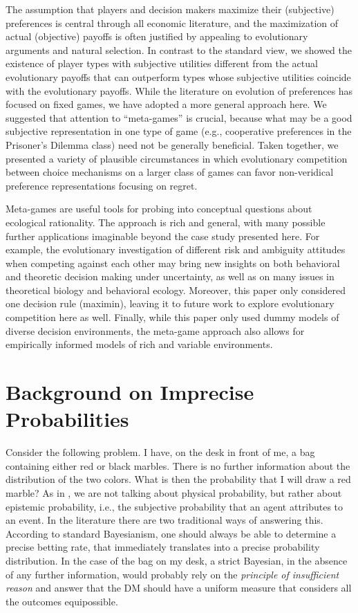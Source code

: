 \documentclass[fleqn,reqno,12pt]{article}
\theoremstyle{Satz}
\theoremstyle{Bsp}
\begin{document}
The assumption that players and decision makers maximize their (subjective) preferences is
central through all economic literature, and the maximization of actual (objective) payoffs is
often justified by appealing to evolutionary arguments and natural selection. In contrast to
the standard view, we showed the existence of player types with subjective utilities different
from the actual evolutionary payoffs that can outperform types whose subjective utilities
coincide with the evolutionary payoffs.  While the literature on evolution of preferences has
focused on fixed games, we have adopted a more general approach here. We suggested that
attention to “meta-games” is crucial, because what may be a good subjective representation in
one type of game (e.g., cooperative preferences in the Prisoner’s Dilemma class) need not be
generally beneficial. Taken together, we presented a variety of plausible circumstances in
which evolutionary competition between choice mechanisms on a larger class of games can favor
non-veridical preference representations focusing on regret.

Meta-games are useful tools for probing into conceptual questions about ecological
rationality. The approach is rich and general, with many possible further applications
imaginable beyond the case study presented here. For example, the evolutionary investigation of
different risk and ambiguity attitudes when competing against each other may bring new insights
on both behavioral and theoretic decision making under uncertainty, as well as on many issues
in theoretical biology and behavioral ecology. Moreover, this paper only considered one
decision rule (maximin), leaving it to future work to explore evolutionary competition here as
well. Finally, while this paper only used dummy models of diverse decision environments, the
meta-game approach also allows for empirically informed models of rich and variable
environments.


\appendix

\iffalse
\section{Background on Imprecise Probabilities}
\label{sec:impr-prob-beli}

Consider the following problem. I have, on the desk in front of me, a bag containing either red
or black marbles. There is no further information about the distribution of the two
colors. What is then the probability that I will draw a red marble? As in \citet{walley96}, we
are not talking about physical probability, but rather about epistemic probability, i.e., the
subjective probability that an agent attributes to an event.  In the literature there are two
traditional ways of answering this. According to standard Bayesianism, one should always be
able to determine a precise betting rate, that immediately translates into a precise
probability distribution. In the case
of the bag on my desk, a strict Bayesian, in the absence of any further information, would
probably rely on the \textit{principle of insufficient reason} and answer that the DM should
have a uniform measure that considers all the outcomes equipossible.
\end{document}
